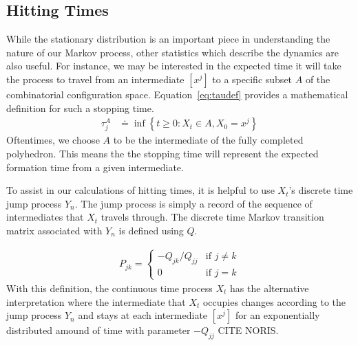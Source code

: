 

\subsection{Hitting Times}

While the stationary distribution is an important piece in understanding the nature of our Markov process, other statistics which describe the dynamics are also useful. For instance, we may be interested in the expected time it will take the process to travel from an intermediate $[x^j]$ to a specific subset $A$ of the combinatorial configuration space. Equation~\ref{eq:taudef} provides a mathematical definition for such a stopping time.
\begin{align}
  \label{eq:taudef}
	\tau^{A}_{j} &\doteq \inf\left\{t \geq 0 : X_t \in A, X_0 = x^j\right\}
\end{align}
Oftentimes, we choose $A$ to be the intermediate of the fully completed polyhedron. This means the the stopping time will represent the expected formation time from a given intermediate.
 
To assist in our calculations of hitting times, it is helpful to use $X_t$'s discrete time jump process $Y_n$. The jump process is simply a record of the sequence of intermediates that $X_t$ travels through. The discrete time Markov transition matrix associated with $Y_n$ is defined using $Q$.

\begin{align}
  \label{eq:Pdef}
  P_{jk} =
  \begin{cases}
   -Q_{jk}/Q_{jj} & \text{if } j \neq k  \\
   0  & \text{if } j = k 
  \end{cases}
\end{align}
With this definition, the continuous time process $X_t$ has the alternative interpretation where the intermediate that $X_t$ occupies changes according to the jump process $Y_n$ and stays at each intermediate $[x^j]$ for an exponentially distributed amound of time with parameter $-Q_{jj}$ CITE NORIS. 
%
%

